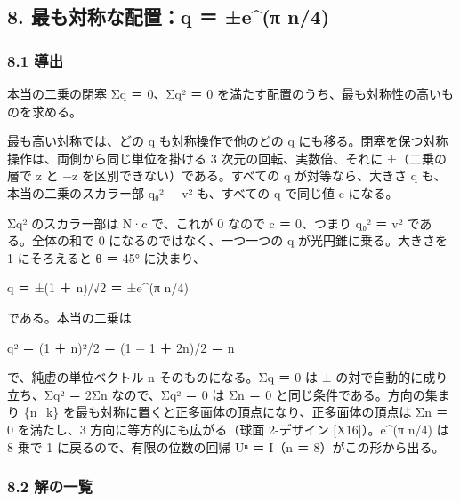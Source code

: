 \documentclass[
  a4paper,
]{ltjsarticle}
\begin{document}
\subsection{8. 最も対称な配置：q ＝ ±e\^{}(π
n/4)}\label{ux6700ux3082ux5bfeux79f0ux306aux914dux7f6eq-eux3c0-n4}

\subsubsection{8.1 導出}\label{ux5c0eux51fa}

本当の二乗の閉塞 Σq ＝ 0、Σq² ＝ 0
を満たす配置のうち、最も対称性の高いものを求める。

最も高い対称では、どの q も対称操作で他のどの q
にも移る。閉塞を保つ対称操作は、両側から同じ単位を掛ける 3
次元の回転、実数倍、それに ±（二乗の層で z と −z
を区別できない）である。すべての q が対等なら、大きさ
\textbar q\textbar{} も、本当の二乗のスカラー部 q₀² −
\textbar v\textbar² も、すべての q で同じ値 c になる。

Σq² のスカラー部は N·c で、これが 0 なので c ＝ 0、つまり q₀² ＝
\textbar v\textbar² である。全体の和で 0 になるのではなく、一つ一つの q
が光円錐に乗る。大きさを 1 にそろえると θ ＝ 45° に決まり、

q ＝ ±(1 ＋ n)/√2 ＝ ±e\^{}(π n/4)

である。本当の二乗は

q² ＝ (1 ＋ n)²/2 ＝ (1 − 1 ＋ 2n)/2 ＝ n

で、純虚の単位ベクトル n そのものになる。Σq ＝ 0 は ±
の対で自動的に成り立ち、Σq² ＝ 2Σn なので、Σq² ＝ 0 は Σn ＝ 0
と同じ条件である。方向の集まり \{n\_k\}
を最も対称に置くと正多面体の頂点になり、正多面体の頂点は Σn ＝ 0
を満たし、3 方向に等方的にも広がる（球面 2-デザイン {[}X16{]}）。e\^{}(π
n/4) は 8 乗で 1 に戻るので、有限の位数の回帰 Uⁿ ＝ I（n ＝
8）がこの形から出る。

\subsubsection{8.2 解の一覧}\label{ux89e3ux306eux4e00ux89a7}
\end{document}
